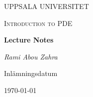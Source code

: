 \begin{titlepage}

  \centering
	{\scshape\LARGE UPPSALA UNIVERSITET\par}
	\vspace{1cm}
  {\scshape\Large {Introduction to PDE} \par}
	\vspace{1.5cm}
  {\huge\bfseries {Lecture Notes} \par}
	\vspace{2cm}
	{\Large\itshape Rami Abou Zahra \par}
	\vfill
  \vfill


  {\large Inlämningsdatum}\par
  {\today}

\end{titlepage}
